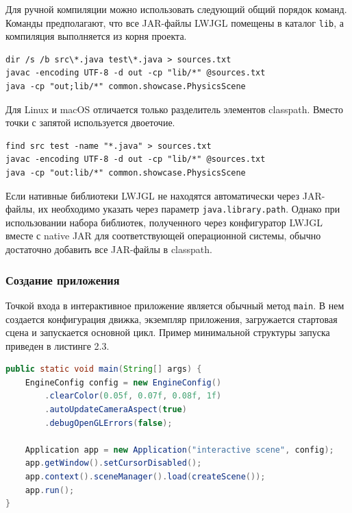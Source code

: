 Для ручной компиляции можно использовать следующий общий порядок команд. Команды предполагают, что все JAR-файлы LWJGL помещены в каталог \texttt{lib}, а компиляция выполняется из корня проекта.

\begin{lstlisting}[caption={Пример ручной компиляции проекта в Windows}]
dir /s /b src\*.java test\*.java > sources.txt
javac -encoding UTF-8 -d out -cp "lib/*" @sources.txt
java -cp "out;lib/*" common.showcase.PhysicsScene
\end{lstlisting}

Для Linux и macOS отличается только разделитель элементов classpath. Вместо точки с запятой используется двоеточие.

\begin{lstlisting}[caption={Пример ручной компиляции проекта в Linux и macOS}]
find src test -name "*.java" > sources.txt
javac -encoding UTF-8 -d out -cp "lib/*" @sources.txt
java -cp "out:lib/*" common.showcase.PhysicsScene
\end{lstlisting}

Если нативные библиотеки LWJGL не находятся автоматически через JAR-файлы, их необходимо указать через параметр \texttt{java.library.path}. Однако при использовании набора библиотек, полученного через конфигуратор LWJGL вместе с native JAR для соответствующей операционной системы, обычно достаточно добавить все JAR-файлы в classpath.

\subsubsection{Создание приложения}

Точкой входа в интерактивное приложение является обычный метод \texttt{main}. В нем создается конфигурация движка, экземпляр приложения, загружается стартовая сцена и запускается основной цикл. Пример минимальной структуры запуска приведен в листинге 2.3.

\begin{lstlisting}[language=Java,caption={Создание приложения и запуск сцены}]
public static void main(String[] args) {
    EngineConfig config = new EngineConfig()
        .clearColor(0.05f, 0.07f, 0.08f, 1f)
        .autoUpdateCameraAspect(true)
        .debugOpenGLErrors(false);

    Application app = new Application("interactive scene", config);
    app.getWindow().setCursorDisabled();
    app.context().sceneManager().load(createScene());
    app.run();
}
\end{lstlisting}

